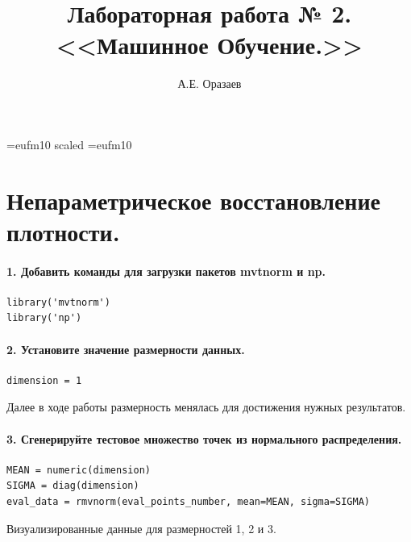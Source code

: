 \documentclass[12pt]{article}
\title{\bf Лабораторная работа № 2. \\ <<Машинное
Обучение.>>}
\author{А.Е. Оразаев}
\date{}
\begin{document}
\voffset=-20mm
\hoffset=-12mm
\font\Got=eufm10 scaled \font\Got=eufm10

\maketitle

\section{Непараметрическое восстановление плотности.}

\paragraph{1. Добавить команды для загрузки пакетов mvtnorm и np.}
\begin{verbatim}
library('mvtnorm')
library('np')
\end{verbatim}

\paragraph{2. Установите значение размерности данных.}
\begin{verbatim}
dimension = 1
\end{verbatim}
Далее в ходе работы размерность менялась для достижения нужных результатов.

\paragraph{3. Сгенерируйте тестовое множество точек из нормального распределения.}
\begin{verbatim}
MEAN = numeric(dimension)
SIGMA = diag(dimension)
eval_data = rmvnorm(eval_points_number, mean=MEAN, sigma=SIGMA)
\end{verbatim}
Визуализированные данные для размерностей 1, 2 и 3.
\end{document}
